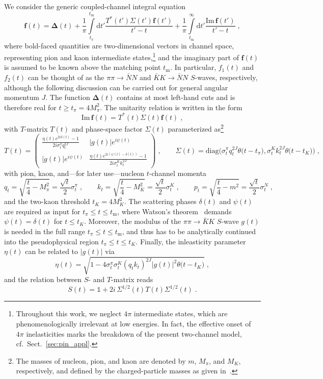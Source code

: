 \documentclass[11pt]{article}%
\providecommand{\ec}{\;,}
\providecommand{\ep}{\;.}
\newcommand{\diff}{\text{d}}
\newcommand{\mpi}{M_{\pi}}
\newcommand{\mK}{M_K}
\newcommand{\unity}{\mathds{1}}
\newcommand{\tpi}{t_\pi}
\newcommand{\tK}{t_K}
\newcommand{\tm}{t_\text{m}}
\newcommand{\ff}{\mathbf{f}}
\newcommand{\Del}{\boldsymbol{\Delta}}
\newcommand{\beq}{\begin{equation}}
\newcommand{\eeq}{\end{equation}}
\renewcommand{\Im}{\text{Im}\,}
\providecommand{\unity}{\mathds{1}}
\begin{document}
We consider the generic coupled-channel integral equation
\beq
\ff(t)=\Del(t)+\frac{1}{\pi}\int\limits_{\tpi}^{\tm}\diff t'\frac{T^*(t')\Sigma(t')\ff(t')}{t'-t}
+\frac{1}{\pi}\int\limits_{\tm}^\infty\diff t'\frac{\Im \ff(t')}{t'-t}\ec
\eeq
where bold-faced quantities are two-dimensional vectors in channel space, representing pion and kaon intermediate states,\footnote{Throughout this work, we neglect $4\pi$ intermediate states, which are phenomenologically irrelevant at low energies. In fact, the effective onset of $4\pi$ inelasticities marks the breakdown of the present two-channel model, cf.\ Sect.~\ref{sec:pin_appl}.} and the imaginary part of $\ff(t)$ is assumed to be known above the matching point $\tm$. In particular, $f_1(t)$ and $f_2(t)$ can be thought of as the $\pi\pi\to\bar N N$ and $\bar K K\to\bar N N$ $S$-waves, respectively, although the following discussion can be carried out for general angular momentum $J$. The function $\Del(t)$ contains at most left-hand cuts and is therefore real for $t\geq \tpi=4\mpi^2$.
The unitarity relation is written in the form
\beq
 \Im \ff(t)=T^*(t)\Sigma(t)\ff(t)\ec
\eeq
with $T$-matrix $T(t)$ and phase-space factor $\Sigma(t)$ parameterized as\footnote{The masses of nucleon, pion, and kaon are denoted by $m$, $\mpi$, and $\mK$, respectively, and defined by the charged-particle masses as given in~\cite{PDG}.} 
\beq
\label{Tmatrix}
T(t)=\begin{pmatrix}
      \frac{\eta(t) e^{2i\delta(t)}-1}{2i\sigma_t^\pi q_t^{2J}} & |g(t)|e^{i\psi(t)}\\ 
  |g(t)|e^{i\psi(t)} & \frac{\eta(t) e^{2i(\psi(t)-\delta(t))}-1}{2i\sigma_t^K k_t^{2J}}
\end{pmatrix}\ec\qquad
\Sigma(t)=\text{diag}\Big(\sigma_t^\pi q_t^{2J}\theta\big(t-\tpi\big), \sigma_t^Kk_t^{2J}\theta\big(t-\tK\big)\Big)\ec
\eeq
with pion, kaon, and---for later use---nucleon $t$-channel momenta
\beq
q_t=\sqrt{\frac{t}{4}-\mpi^2}=\frac{\sqrt{t}}{2}\sigma_t^\pi\ec\qquad k_t=\sqrt{\frac{t}{4}-\mK^2}=\frac{\sqrt{t}}{2}\sigma_t^K\ec\qquad
p_t=\sqrt{\frac{t}{4}-m^2}=\frac{\sqrt{t}}{2}\sigma_t^N \ec
\eeq
and the two-kaon threshold $\tK=4\mK^2$.
The scattering phases $\delta(t)$ and $\psi(t)$ are required as input for $\tpi\leq t\leq\tm$, where Watson's theorem~\cite{Watson} demands $\psi(t)=\delta(t)$ for $t\leq \tK$. Moreover, the modulus of the $\pi\pi\to\bar K K$ $S$-wave $g(t)$ is needed in the full range $\tpi\leq t\leq\tm$, and thus has to be analytically continued into the pseudophysical region $\tpi\leq t\leq \tK$. Finally, the inleasticity parameter $\eta(t)$ can be related to $|g(t)|$ via    
\beq
\eta(t)=\sqrt{1-4\sigma_t^\pi\sigma_t^K(q_tk_t)^{2J}|g(t)|^2\theta\big(t-\tK\big)}\ec
\eeq
and the relation between $S$- and $T$-matrix reads
\beq
S(t)=\unity+2i\,\Sigma^{1/2}(t)T(t)\Sigma^{1/2}(t)\ep
\eeq
\end{document}
